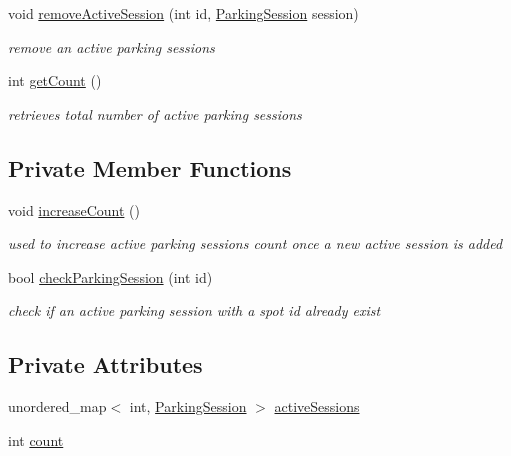 \begin{DoxyCompactItemize}
void \mbox{\hyperlink{class_active_parking_sessions_a5fca1c37eb394caa299ca5433e648051}{remove\+Active\+Session}} (int id, \mbox{\hyperlink{class_parking_session}{Parking\+Session}} session)
\begin{DoxyCompactList}\small\item\em remove an active parking sessions \end{DoxyCompactList}\item 
int \mbox{\hyperlink{class_active_parking_sessions_aae920aab19389cd3e772720bda66ca79}{get\+Count}} ()
\begin{DoxyCompactList}\small\item\em retrieves total number of active parking sessions \end{DoxyCompactList}\end{DoxyCompactItemize}
\subsection*{Private Member Functions}
\begin{DoxyCompactItemize}
\item 
void \mbox{\hyperlink{class_active_parking_sessions_a32bb2ec28e44b62ad96d9acb2295f9c3}{increase\+Count}} ()
\begin{DoxyCompactList}\small\item\em used to increase active parking sessions count once a new active session is added \end{DoxyCompactList}\item 
bool \mbox{\hyperlink{class_active_parking_sessions_a0f8c8e3d21629e9f0a325bdbb0f4ac87}{check\+Parking\+Session}} (int id)
\begin{DoxyCompactList}\small\item\em check if an active parking session with a spot id already exist \end{DoxyCompactList}\end{DoxyCompactItemize}
\subsection*{Private Attributes}
\begin{DoxyCompactItemize}
\item 
unordered\+\_\+map$<$ int, \mbox{\hyperlink{class_parking_session}{Parking\+Session}} $>$ \mbox{\hyperlink{class_active_parking_sessions_ac85c55c90db020157588dcc520cbfa22}{active\+Sessions}}
\item 
int \mbox{\hyperlink{class_active_parking_sessions_a8097a4407c5f9e02444740df84602840}{count}}
\end{DoxyCompactItemize}


